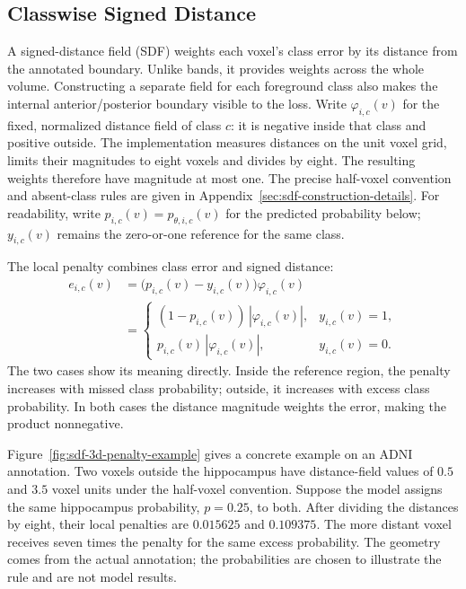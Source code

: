 \documentclass[12pt,a4paper]{article}
\begin{document}
\subsection{Classwise Signed Distance}\label{sec:sdf-constraints}

A signed-distance field (SDF) weights each voxel's class error by its
distance from the annotated boundary. Unlike bands, it provides weights
across the whole volume. Constructing a separate field for each foreground
class also makes the internal anterior/posterior boundary visible to the
loss. Write $\varphi_{i,c}(v)$ for the fixed, normalized distance field of
class $c$: it is negative inside that class and positive outside.
The implementation measures distances on the unit voxel grid, limits
their magnitudes to eight voxels and divides by eight. The resulting
weights therefore have magnitude at most one. The precise half-voxel
convention and absent-class rules are given in
Appendix~\ref{sec:sdf-construction-details}. For readability, write
$p_{i,c}(v)=p_{\theta,i,c}(v)$ for the predicted probability below;
$y_{i,c}(v)$ remains the zero-or-one reference for the same class.

The local penalty combines class error and signed distance:
\begin{equation}
\begin{aligned}
e_{i,c}(v)
&=\bigl(p_{i,c}(v)-y_{i,c}(v)\bigr)\varphi_{i,c}(v)\\
&=\begin{cases}
   (1-p_{i,c}(v))\,|\varphi_{i,c}(v)|, &y_{i,c}(v)=1,\\
   p_{i,c}(v)\,|\varphi_{i,c}(v)|, &y_{i,c}(v)=0.
  \end{cases}
\end{aligned}
\label{eq:sdf-local-violation}
\end{equation}
The two cases show its meaning directly. Inside the reference region,
the penalty increases with missed class probability; outside, it
increases with excess class probability. In both cases the distance
magnitude weights the error, making the product nonnegative.

Figure~\ref{fig:sdf-3d-penalty-example} gives a concrete example on an
ADNI annotation. Two voxels outside the hippocampus have distance-field
values of $0.5$ and $3.5$ voxel units under the half-voxel convention.
Suppose the model assigns the same hippocampus probability, $p=0.25$, to
both. After dividing the distances by eight, their local penalties are
$0.015625$ and $0.109375$. The more distant voxel receives seven times
the penalty for the same excess probability. The geometry comes from
the actual annotation; the probabilities are chosen to illustrate the
rule and are not model results.
\end{document}
